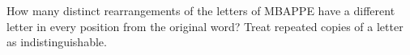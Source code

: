How many distinct rearrangements of the letters of MBAPPE have a different letter in every position from the original word? Treat repeated copies of a letter as indistinguishable.
